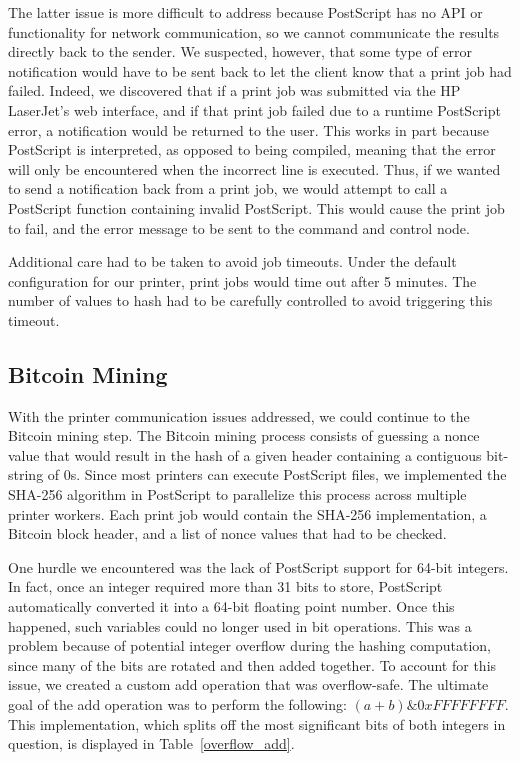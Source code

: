The latter issue is more difficult to address because PostScript has no API or functionality for network communication, so we cannot communicate the results directly back to the sender.
We suspected, however, that some type of error notification would have to be sent back to let the client know that a print job had failed.
Indeed, we discovered that if a print job was submitted via the HP LaserJet's web interface, and if that print job failed due to a runtime PostScript error, a notification would be returned to the user.
This works in part because PostScript is interpreted, as opposed to being compiled, meaning that the error will only be encountered when the incorrect line is executed.
Thus, if we wanted to send a notification back from a print job, we would attempt to call a PostScript function containing invalid PostScript.
This would cause the print job to fail, and the error message to be sent to the command and control node.

Additional care had to be taken to avoid job timeouts.
Under the default configuration for our printer, print jobs would time out after 5 minutes.
The number of values to hash had to be carefully controlled to avoid triggering this timeout.

\subsection{Bitcoin Mining}

With the printer communication issues addressed, we could continue to the Bitcoin mining step.
The Bitcoin mining process consists of guessing a nonce value that would result in the hash of a given header containing a contiguous bit-string of 0s.
Since most printers can execute PostScript files, we implemented the SHA-256 algorithm in PostScript to parallelize this process across multiple printer workers.
Each print job would contain the SHA-256 implementation, a Bitcoin block header, and a list of nonce values that had to be checked.

One hurdle we encountered was the lack of PostScript support for 64-bit integers.
In fact, once an integer required more than 31 bits to store, PostScript automatically converted it into a 64-bit floating point number.
Once this happened, such variables could no longer used in bit operations.
This was a problem because of potential integer overflow during the hashing computation, since many of the bits are rotated and then added together.
To account for this issue, we created a custom add operation that was overflow-safe.
The ultimate goal of the add operation was to perform the following: $(a + b) \& 0xFFFFFFFF$.
This implementation, which splits off the most significant bits of both integers in question, is displayed in Table~\ref{overflow_add}.

